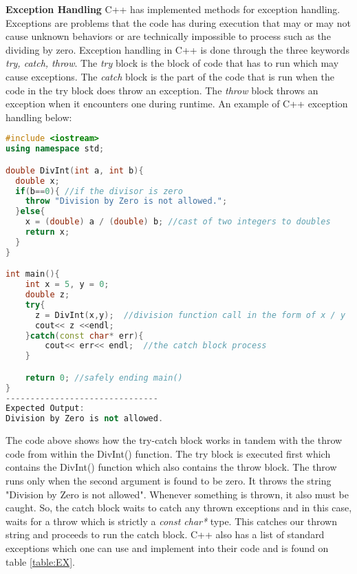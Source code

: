 \documentclass[12pt]{article}
\begin{document}
\textbf{Exception Handling} C++ has implemented methods for exception handling. Exceptions are problems that the code has during execution that may or may not cause unknown behaviors or are technically impossible to process such as the dividing by zero. Exception handling in C++ is done through the three keywords \textit{try, catch, throw}. The \textit{try} block is the block of code that has to run which may cause exceptions. The \textit{catch} block is the part of the code that is run when the code in the try block does throw an exception. The \textit{throw} block throws an exception when it encounters one during runtime. An example of C++ exception handling below:

\begin{lstlisting}[language = C++]
#include <iostream>
using namespace std;

double DivInt(int a, int b){
  double x;
  if(b==0){ //if the divisor is zero
    throw "Division by Zero is not allowed.";
  }else{
    x = (double) a / (double) b; //cast of two integers to doubles
    return x;
  }
}

int main(){
    int x = 5, y = 0;
    double z;
    try{
      z = DivInt(x,y);  //division function call in the form of x / y
      cout<< z <<endl; 
    }catch(const char* err){
        cout<< err<< endl;  //the catch block process
    }

    return 0; //safely ending main()
}
-------------------------------
Expected Output:
Division by Zero is not allowed.
\end{lstlisting}

The code above shows how the try-catch block works in tandem with the throw code from within the DivInt() function. The try block is executed first which contains the DivInt() function which also contains the throw block. The throw runs only when the second argument is found to be zero. It throws the string "Division by Zero is not allowed". Whenever something is thrown, it also must be caught. So, the catch block waits to catch any thrown exceptions and in this case, waits for a throw which is strictly a \textit{const char* } type. This catches our thrown string and proceeds to run the catch block. C++ also has a list of standard exceptions which one can use and implement into their code and is found on table \ref{table:EX}.
\end{document}
